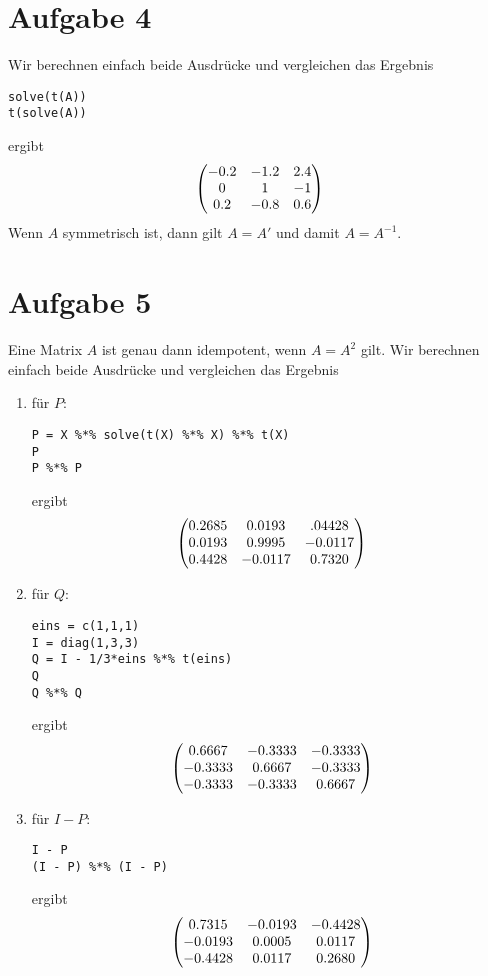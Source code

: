 \documentclass{article}
\begin{document}
	\section*{Aufgabe 4}
	Wir berechnen einfach beide Ausdrücke und vergleichen das Ergebnis
	\begin{lstlisting}[style=R]
solve(t(A))
t(solve(A))
	\end{lstlisting}
	ergibt
	\begin{align}
		\begin{pmatrix}
			-0.2 & -1.2 & 2.4 \\ 0 & 1 & -1 \\ 0.2 & -0.8 & 0.6
		\end{pmatrix} \notag
	\end{align}
	Wenn $A$ symmetrisch ist, dann gilt $A=A'$ und damit $A = A^{-1}$.

	\section*{Aufgabe 5}
	Eine Matrix $A$ ist genau dann idempotent, wenn $A=A^2$ gilt. Wir berechnen einfach beide Ausdrücke und vergleichen das Ergebnis
	\begin{enumerate}[label=(\alph*)]
		\item für $P$:
		\begin{lstlisting}[style=R]
P = X %*% solve(t(X) %*% X) %*% t(X)
P
P %*% P
		\end{lstlisting}
		ergibt
		\begin{align}
			\begin{pmatrix}
				0.2685 & 0.0193 & .04428 \\ 0.0193 & 0.9995 & -0.0117 \\ 0.4428 & -0.0117 & 0.7320
			\end{pmatrix} \notag
		\end{align}
		\item für $Q$: 
		\begin{lstlisting}[style=R]
eins = c(1,1,1)
I = diag(1,3,3)
Q = I - 1/3*eins %*% t(eins)
Q
Q %*% Q
		\end{lstlisting}
		ergibt
		\begin{align}
			\begin{pmatrix}
				0.6667 & -0.3333 & -0.3333 \\ -0.3333 & 0.6667 & -0.3333 \\ -0.3333 & -0.3333 & 0.6667
			\end{pmatrix} \notag
		\end{align}
		\item für $I-P$:
		\begin{lstlisting}[style=R]
I - P
(I - P) %*% (I - P)
		\end{lstlisting}
		ergibt
		\begin{align}
			\begin{pmatrix}
				0.7315 & -0.0193 & -0.4428 \\ -0.0193 & 0.0005 &  0.0117 \\ -0.4428 & 0.0117 & 0.2680
			\end{pmatrix} \notag
		\end{align}
		
	\end{enumerate}
	
\end{document}

